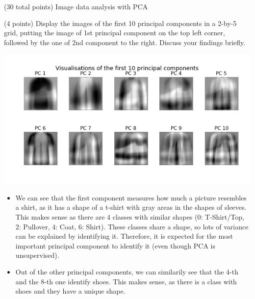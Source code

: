 \documentclass[12pt]{article}
\begin{document}
\begin{question}{(30 total points) Image data analysis with PCA}
\begin{subquestion}
   \end{subquestion}

   \begin{subquestion}{(4 points)
      Display the images of the first 10 principal components in
      a 2-by-5 grid, putting the image of 1st principal component on
      the top left corner, followed by the one of 2nd component to the right.
      Discuss your findings briefly.
     } \label{Q1.disp.pca}
   

      \begin{answerbox}{35em}
         \begin{center}
	\includegraphics[width=\textwidth]{imgs/1_5.png}
	\end{center}
	
	\begin{itemize}
	\itemsep -3pt {}
	\item We can see that the first component measures how much a picture resembles a shirt, as it has a shape of a t-shirt with gray areas in the shapes of sleeves. This makes sense as there are 4 classes with similar shapes (0: T-Shirt/Top, 2: Pullover, 4: Coat, 6: Shirt). These classes share a shape, so lots of variance can be explained by identifying it. Therefore, it is expected for the most important principal component to identify it (even though PCA is unsupervised).
	\item Out of the other principal components, we can similarily see that the 4-th and the 8-th one identify shoes. This makes sense, as there is a class with shoes and they have a unique shape.
	\end{itemize}
      \end{answerbox}
  


   \end{subquestion}


\end{question}
\end{document}
